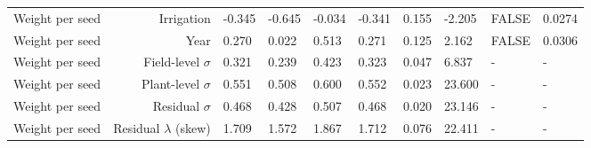\begin{landscape}
\begin{longtable}{|r|r|l|l|l|l|l|l|l|l|}
  Weight per seed & Irrigation & -0.345 & -0.645 & -0.034 & -0.341 & 0.155 & -2.205 & FALSE & 0.0274 \\ 
  Weight per seed & Year & 0.270 & 0.022 & 0.513 & 0.271 & 0.125 & 2.162 & FALSE & 0.0306 \\ 
  Weight per seed & Field-level $\sigma$ & 0.321 & 0.239 & 0.423 & 0.323 & 0.047 & 6.837 & - & - \\ 
  Weight per seed & Plant-level $\sigma$ & 0.551 & 0.508 & 0.600 & 0.552 & 0.023 & 23.600 & - & - \\
  Weight per seed & Residual $\sigma$ & 0.468 & 0.428 & 0.507 & 0.468 & 0.020 & 23.146 & - & - \\ 
  Weight per seed & Residual $\lambda$ (skew) & 1.709 & 1.572 & 1.867 & 1.712 & 0.076 & 22.411 & - & - \\ 
  \hline %
  
  

\end{longtable}
\end{landscape}
